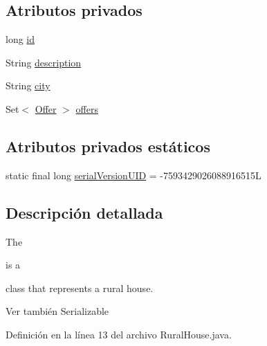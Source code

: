 \subsection*{Atributos privados}
\begin{DoxyCompactItemize}
\item 
long \mbox{\hyperlink{classcom_1_1ruralhousejsf_1_1domain_1_1_rural_house_ad9352e84ead5c4feb7eadee60570d9de}{id}}
\item 
String \mbox{\hyperlink{classcom_1_1ruralhousejsf_1_1domain_1_1_rural_house_a3cd460d3df936008a7c7580e87680fd4}{description}}
\item 
String \mbox{\hyperlink{classcom_1_1ruralhousejsf_1_1domain_1_1_rural_house_a495797ff9bd294c83563790e36ec2245}{city}}
\item 
Set$<$ \mbox{\hyperlink{classcom_1_1ruralhousejsf_1_1domain_1_1_offer}{Offer}} $>$ \mbox{\hyperlink{classcom_1_1ruralhousejsf_1_1domain_1_1_rural_house_a8e07bbd638166d5d9356828a4ce09488}{offers}}
\end{DoxyCompactItemize}
\subsection*{Atributos privados estáticos}
\begin{DoxyCompactItemize}
\item 
static final long \mbox{\hyperlink{classcom_1_1ruralhousejsf_1_1domain_1_1_rural_house_a2ef1095a366b8e08e491c70cd421b907}{serial\+Version\+U\+ID}} = -\/7593429026088916515L
\end{DoxyCompactItemize}


\subsection{Descripción detallada}
The
\begin{DoxyCode}{0}
\end{DoxyCode}
 is a
\begin{DoxyCode}{0}
\end{DoxyCode}
 class that represents a rural house.

\begin{DoxySeeAlso}{Ver también}
Serializable 
\end{DoxySeeAlso}


Definición en la línea 13 del archivo Rural\+House.\+java.



